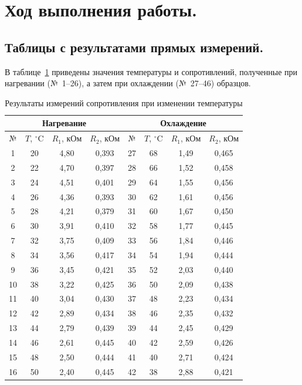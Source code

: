 \documentclass[12pt, a4paper]{article}
\begin{document}
	\section{Ход выполнения работы.}
	
	\subsection{Таблицы с результатами прямых измерений.}
	В таблице~\ref{tab:data} приведены значения температуры и сопротивлений, полученные при нагревании (№~1--26), а затем при охлаждении (№~27--46) образцов.
	
	\begin{table}[H]
		\caption{Результаты измерений сопротивления при изменении температуры}
		\label{tab:data}
		\centering
		\small
		\begin{tabular}{|c|c|c|c||c|c|c|c|}
			\hline
			\multicolumn{4}{|c||}{Нагревание} & \multicolumn{4}{c|}{Охлаждение} \\
			\hline
			№ & $T$, $^\circ$C & $R_1$, кОм & $R_2$, кОм & № & $T$, $^\circ$C & $R_1$, кОм & $R_2$, кОм \\
			\hline
			1 & 20 & 4,80 & 0,393 & 27 & 68 & 1,49 & 0,465 \\
			2 & 22 & 4,70 & 0,397 & 28 & 66 & 1,52 & 0,458 \\
			3 & 24 & 4,51 & 0,401 & 29 & 64 & 1,55 & 0,456 \\
			4 & 26 & 4,36 & 0,393 & 30 & 62 & 1,61 & 0,456 \\
			5 & 28 & 4,21 & 0,379 & 31 & 60 & 1,67 & 0,450 \\
			6 & 30 & 3,91 & 0,410 & 32 & 58 & 1,77 & 0,445 \\
			7 & 32 & 3,75 & 0,409 & 33 & 56 & 1,84 & 0,446 \\
			8 & 34 & 3,56 & 0,417 & 34 & 54 & 1,94 & 0,444 \\
			9 & 36 & 3,45 & 0,421 & 35 & 52 & 2,03 & 0,440 \\
			10 & 38 & 3,22 & 0,425 & 36 & 50 & 2,09 & 0,438 \\
			11 & 40 & 3,04 & 0,430 & 37 & 48 & 2,23 & 0,434 \\
			12 & 42 & 2,89 & 0,434 & 38 & 46 & 2,35 & 0,432 \\
			13 & 44 & 2,79 & 0,439 & 39 & 44 & 2,45 & 0,429 \\
			14 & 46 & 2,61 & 0,445 & 40 & 42 & 2,59 & 0,426 \\
			15 & 48 & 2,50 & 0,444 & 41 & 40 & 2,71 & 0,424 \\
			16 & 50 & 2,40 & 0,445 & 42 & 38 & 2,88 & 0,421 \\

\end{tabular}
\end{table}
\end{document}
